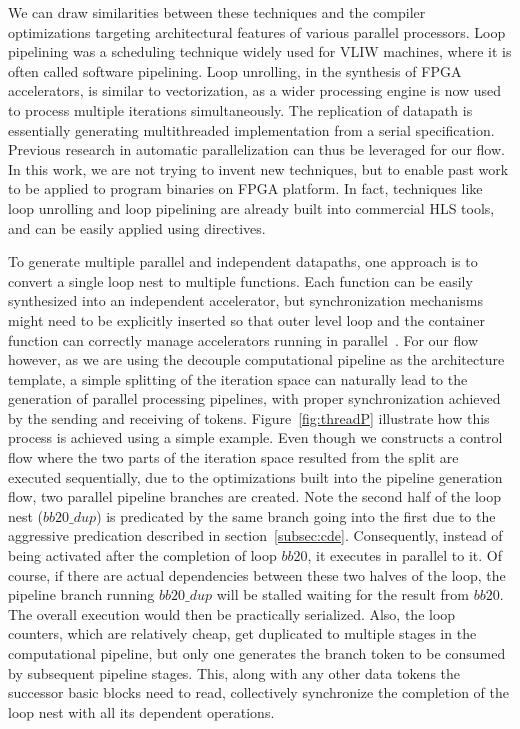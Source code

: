 We can draw similarities between these techniques and the compiler optimizations targeting architectural features
of various parallel processors. Loop pipelining was a scheduling technique
widely used for VLIW machines, where it is often called software pipelining. Loop unrolling, in the synthesis of FPGA
accelerators, is similar to vectorization, as a wider processing engine
is now used to process multiple iterations simultaneously. The replication of
datapath is essentially generating multithreaded implementation from a serial specification. 
Previous research in automatic parallelization can thus be
leveraged for our flow. In this work, we are not trying to invent new techniques, but to enable past work to be applied to program binaries on FPGA platform. In fact, techniques like loop unrolling and loop pipelining are already built into commercial HLS tools, and can be easily applied using directives.


To generate multiple parallel and independent datapaths, one approach is to convert a single loop nest to multiple functions.
Each function can be easily synthesized into an independent accelerator, but synchronization mechanisms might need to be explicitly inserted so that outer level loop and the container function can correctly manage accelerators running in parallel~\cite{Sheffield:EECS-2013-185}. 
For our flow however, as we are using the decouple computational pipeline as the architecture template, a simple splitting of the iteration space can naturally lead to the generation of parallel processing pipelines, with proper synchronization achieved by the sending and receiving of tokens. Figure~\ref{fig:threadP} illustrate how this process is achieved using a simple example. Even though we constructs a control flow where the two parts of the iteration space resulted from the split are executed sequentially, due to the optimizations built into the pipeline generation flow, two parallel pipeline branches are created. Note the second half of the loop nest ($bb20\_dup$) is predicated by the same branch going into the first due to the aggressive predication described in section~\ref{subsec:cde}. Consequently, instead of being activated after the completion of loop $bb20$, it executes in parallel to it. Of course, if there are actual dependencies between these two halves of the loop, the pipeline branch running $bb20\_dup$ will be stalled waiting for the result from $bb20$. The overall execution would then be practically serialized. Also, the loop counters, which are relatively cheap, get duplicated to multiple stages in the computational pipeline, but only one generates the branch token to be consumed by subsequent pipeline stages. This, along with any other data tokens the successor basic blocks need to read, collectively synchronize the completion of the loop nest with all its dependent operations. 
 
